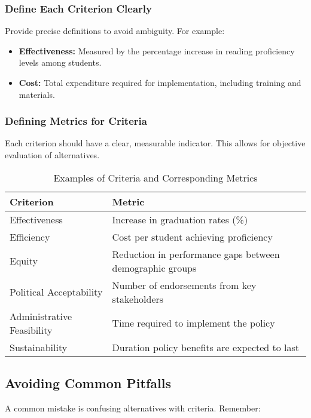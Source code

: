 \documentclass{article}
\theoremstyle{definition}
\theoremstyle{plain}
\begin{document}
\subsubsection{Define Each Criterion Clearly}

Provide precise definitions to avoid ambiguity. For example:

\begin{itemize}
    \item \textbf{Effectiveness:} Measured by the percentage increase in reading proficiency levels among students.
    
    \item \textbf{Cost:} Total expenditure required for implementation, including training and materials.
\end{itemize}

\subsubsection{Defining Metrics for Criteria}

Each criterion should have a clear, measurable indicator. This allows for objective evaluation of alternatives.

\begin{table}[H]
\caption{Examples of Criteria and Corresponding Metrics}
\centering 
\begin{tabular}{ll}
\toprule
\textbf{Criterion} & \textbf{Metric} \\
\midrule
Effectiveness & Increase in graduation rates (\%) \\
Efficiency & Cost per student achieving proficiency \\
Equity & Reduction in performance gaps between demographic groups \\
Political Acceptability & Number of endorsements from key stakeholders \\
Administrative Feasibility & Time required to implement the policy \\
Sustainability & Duration policy benefits are expected to last \\
\bottomrule
\end{tabular}
\end{table}

\subsection{Avoiding Common Pitfalls}

A common mistake is confusing alternatives with criteria. Remember:
\end{document}

